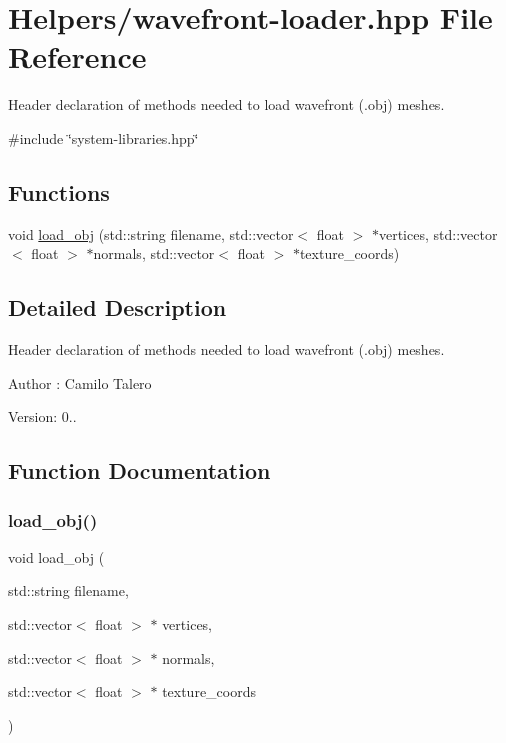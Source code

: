 \hypertarget{wavefront-loader_8hpp}{}\section{Helpers/wavefront-\/loader.hpp File Reference}
\label{wavefront-loader_8hpp}


Header declaration of methods needed to load wavefront (.obj) meshes.  


{\ttfamily \#include \char`\"{}system-\/libraries.\+hpp\char`\"{}}\newline
\subsection*{Functions}
\begin{DoxyCompactItemize}
\item 
void \mbox{\hyperlink{wavefront-loader_8hpp_a545203558434ccbdf58e4fa3505153a6}{load\+\_\+obj}} (std\+::string filename, std\+::vector$<$ float $>$ $\ast$vertices, std\+::vector$<$ float $>$ $\ast$normals, std\+::vector$<$ float $>$ $\ast$texture\+\_\+coords)
\end{DoxyCompactItemize}


\subsection{Detailed Description}
Header declaration of methods needed to load wavefront (.obj) meshes. 

\begin{DoxyAuthor}{Author}
\+: Camilo Talero
\end{DoxyAuthor}
Version\+: 0.. 

\subsection{Function Documentation}
\mbox{\label{wavefront-loader_8hpp_a545203558434ccbdf58e4fa3505153a6}} 
\subsubsection{\texorpdfstring{load\+\_\+obj()}{load\_obj()}}
{\footnotesize\ttfamily void load\+\_\+obj (\begin{DoxyParamCaption}\item[{std\+::string}]{filename,  }\item[{std\+::vector$<$ float $>$ $\ast$}]{vertices,  }\item[{std\+::vector$<$ float $>$ $\ast$}]{normals,  }\item[{std\+::vector$<$ float $>$ $\ast$}]{texture\+\_\+coords }\end{DoxyParamCaption})}

